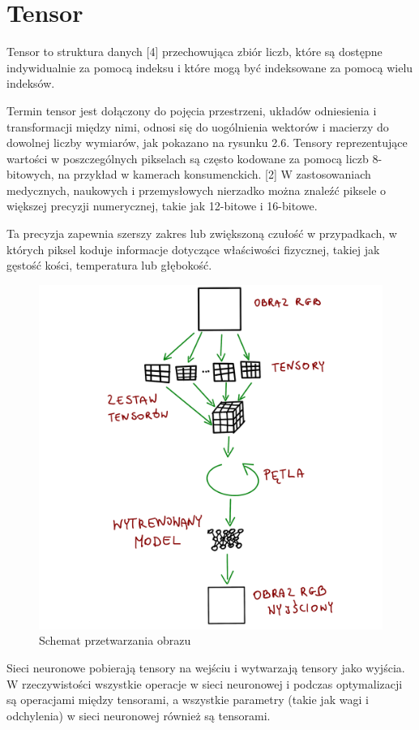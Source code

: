\documentclass[brudnopis]{xmgr}
\begin{document}
\section{Tensor\label{s:dsssl}}


Tensor to struktura danych [4] przechowująca zbiór liczb, które są dostępne indywidualnie za pomocą indeksu i które mogą być indeksowane za pomocą wielu indeksów.

Termin tensor jest dołączony do pojęcia przestrzeni, układów odniesienia i transformacji między nimi, odnosi się do uogólnienia wektorów i macierzy do dowolnej liczby wymiarów, jak pokazano na rysunku 2.6.
Tensory reprezentujące wartości w poszczególnych pikselach są często kodowane za pomocą liczb 8-bitowych, na przykład w kamerach konsumenckich. [2] W zastosowaniach medycznych, naukowych i przemysłowych nierzadko można znaleźć piksele o większej precyzji numerycznej, takie jak 12-bitowe i 16-bitowe.

 Ta precyzja zapewnia szerszy zakres lub zwiększoną czułość w przypadkach, w których piksel koduje informacje dotyczące właściwości fizycznej, takiej jak gęstość kości, temperatura lub głębokość.
 
 \begin{figure}[!tbh]
\centering
\includegraphics[width=.8\hsize]{fig/5}
\caption{Schemat przetwarzania obrazu\label{RYS.5}}
\end{figure}

Sieci neuronowe pobierają tensory na wejściu i wytwarzają tensory jako wyjścia. W rzeczywistości wszystkie operacje w sieci neuronowej i podczas optymalizacji są operacjami między tensorami, a wszystkie parametry (takie jak wagi i odchylenia) w sieci neuronowej również są tensorami.
\end{document}
